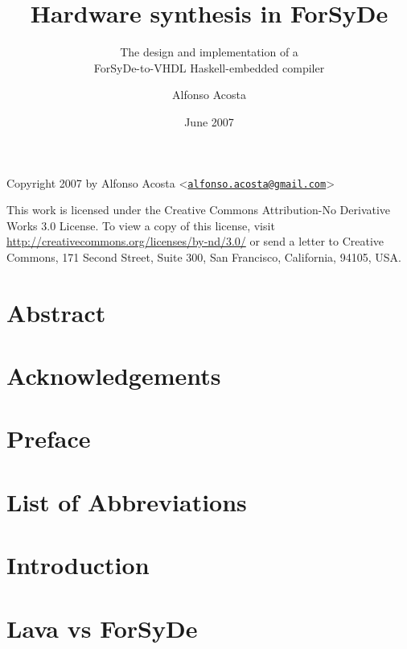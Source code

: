 \documentclass[a4paper,twoside,12pt]{kth-mag}
\title{Hardware synthesis in ForSyDe}
\subtitle{The design and implementation of a\\ ForSyDe-to-VHDL Haskell-embedded compiler}
\author{Alfonso Acosta}
\date{June 2007}
\begin{document}
\begin{titlingpage}
\maketitle

\begingroup
\vspace*{\fill}
\footnotesize
\setlength{\parindent}{0pt}
\setlength{\parskip}{\baselineskip}
Copyright \textcopyright{} 2007 by Alfonso Acosta <\href{mailto:alfonso.acosta@gmail.com}{\nolinkurl{alfonso.acosta@gmail.com}}>

This work is licensed under the Creative Commons Attribution-No
Derivative Works 3.0 License. To view a copy of this license, visit
\url{http://creativecommons.org/licenses/by-nd/3.0/} or send a letter
to Creative Commons, 171 Second Street, Suite 300, San Francisco,
California, 94105, USA.
\endgroup
\end{titlingpage}
 
\frontmatter
\chapter{Abstract}



\chapter{Acknowledgements}


\chapter{Preface}

\clearpage
\tableofcontents
\clearpage
\listoffigures
\clearpage
\chapter{List of Abbreviations}

\clearpage
\mainmatter



\chapter{Introduction}
\label{chap:intro}

\chapter{Lava vs ForSyDe}
\label{chap:vs}

\end{document}
